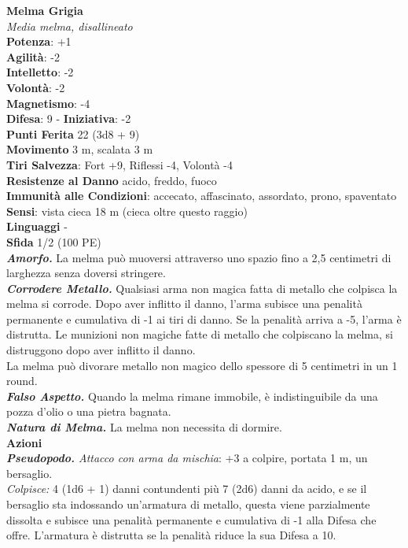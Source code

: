 \begin{multicols}{2}
\medskip\textbf{Melma Grigia}\\
\emph{Media melma, disallineato}\\
\textbf{Potenza}: +1\\
\textbf{Agilità}: -2\\
\textbf{Intelletto}: -2\\
\textbf{Volontà}: -2\\
\textbf{Magnetismo}: -4\\
\textbf{Difesa}: 9 - \textbf{Iniziativa}: -2\\
\textbf{Punti Ferita} 22 (3d8 + 9)\\
\textbf{Movimento} 3 m, scalata 3 m\\
\textbf{Tiri Salvezza}: Fort +9, Riflessi -4, Volontà -4\\
\textbf{Resistenze al Danno} acido, freddo, fuoco\\
\textbf{Immunità alle Condizioni}: accecato, affascinato, assordato, prono, spaventato
\textbf{Sensi}: vista cieca 18 m (cieca oltre questo raggio)\\
\textbf{Linguaggi} -\\
\textbf{Sfida} 1/2 (100 PE)\smallskip\\
\emph{\textbf{Amorfo.}} La melma può muoversi attraverso uno spazio fino a 2,5 centimetri di larghezza senza doversi stringere.\\
\emph{\textbf{Corrodere Metallo.}} Qualsiasi arma non magica fatta di metallo che colpisca la melma si corrode. Dopo aver inflitto il danno, l'arma subisce una penalità permanente e cumulativa di -1 ai tiri di danno. Se la penalità arriva a -5, l'arma è distrutta. Le munizioni non magiche fatte di metallo che colpiscano la melma, si distruggono dopo aver inflitto il danno.\\
La melma può divorare metallo non magico dello spessore di 5 centimetri in un 1 round.\\
\emph{\textbf{Falso Aspetto.}} Quando la melma rimane immobile, è indistinguibile da una pozza d'olio o una pietra bagnata.\\
\emph{\textbf{Natura di Melma.}} La melma non necessita di dormire. \\
\smallskip\textbf{Azioni}\\
\emph{\textbf{Pseudopodo.} Attacco con arma da mischia}: +3 a colpire, portata 1 m, un bersaglio.\\
\emph{Colpisce:} 4 (1d6 + 1) danni contundenti più 7 (2d6) danni da acido, e se il bersaglio sta indossando un'armatura di metallo, questa viene parzialmente dissolta e subisce una penalità permanente e cumulativa di -1 alla Difesa che offre. L'armatura è distrutta se la penalità riduce la sua Difesa a 10.\\

\end{multicols}
